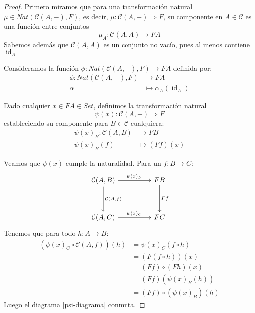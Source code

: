 \documentclass[12pt, twoside]{book}
\newcommand{\cat}{{\mathcal{C}}}
\newcommand{\Set}{{Set}}
\DeclareMathOperator{\id}{id}
\begin{document}
\begin{proof}
Primero miramos que para una transformación natural $\mu \in Nat(\cat(A,-),F)$, es decir, $\mu \colon \cat(A,-) \Rightarrow F$, su componente en $A \in \cat$ es una función entre conjuntos
\[ \mu_A \colon \cat(A,A) \to F A \]
Sabemos además que $\cat(A,A)$ es un conjunto no vacío, pues al menos contiene $\id_A$

Consideramos la función $\phi \colon Nat(\cat(A,-),F) \to F A$ definida por:
\begin{align*}
  \phi \colon Nat(\cat(A,-),F) & \to F A\\
  \alpha & \mapsto \alpha_A(\id_A)
\end{align*}

Dado cualquier $x \in F A \in \Set$, definimos la transformación natural 
\[ \psi(x) \colon \cat(A,-) \Rightarrow F \]
estableciendo su componente para $B \in \cat$ cualquiera:
\begin{align*}
  \psi(x)_B \colon \cat(A,B) & \to F B\\
  \psi(x)_B (f) & \mapsto (F f)(x)
\end{align*}

Veamos que $\psi(x)$ cumple la naturalidad. Para un $f \colon B \to C$:
\begin{equation}\label{psi-diagrama}
\begin{tikzcd}
  {\cat(A,B)} \arrow[rr,"\psi(x)_B"] \arrow[dd,"{\cat(A,f)}"] & & F B \arrow[dd,"F f"]\\
  &\\
  {\cat(A,C)} \arrow[rr,"\psi(x)_C"] & & F C
\end{tikzcd}
\end{equation}
Tenemos que para todo $h \colon A \to B$:
\begin{align*}
(\psi(x)_C \circ \cat(A,f)) (h) & = \psi(x)_C (f \circ h)\\
& = (F (f \circ h))(x)\\
& = (F f) \circ (F h)(x)\\
& = (F f)(\psi(x)_B(h))\\
& = (F f) \circ (\psi(x)_B)(h)
\end{align*}
Luego el diagrama \ref{psi-diagrama} conmuta.


\end{proof}
\end{document}
